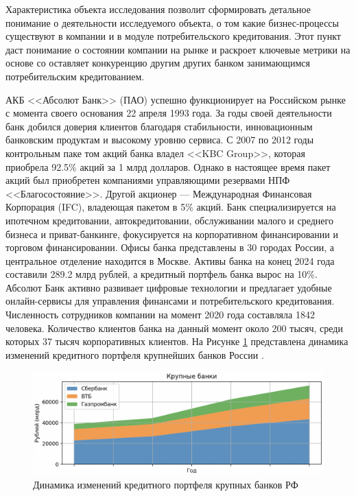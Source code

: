 \documentclass[14pt, a4paper]{extarticle}
\begin{document}
Характеристика объекта исследования позволит сформировать детальное понимание о
деятельности исследуемого объекта, о том какие бизнес-процессы существуют в
компании и в модуле потребительского кредитования. Этот пункт даст понимание о
состоянии компании на рынке и раскроет ключевые метрики на основе со
оставляет конкуренцию другим других банком занимающимся потребительским
кредитованием.

АКБ <<Абсолют Банк>> (ПАО) успешно функционирует на Российском рынке с момента
своего основания 22 апреля 1993 года. За годы своей деятельности банк добился
доверия клиентов благодаря стабильности, инновационным банковским продуктам и
высокому уровню сервиса. С 2007 по 2012 годы контрольным паке том акций банка
владел <<KBC Group>>, которая приобрела 92.5\% акций за 1 млрд долларов. Однако
в настоящее время пакет акций был приобретен компаниями управляющими резервами
НПФ <<Благосостояние>>. Другой акционер — Международная Финансовая Корпорация
(IFC), владеющая пакетом в 5\% акций. Банк специализируется на ипотечном
кредитовании, автокредитовании, обслуживании малого и среднего бизнеса и
приват-банкинге, фокусируется на корпоративном финансировании и торговом
финансировании. Офисы банка представлены в 30 городах России, а центральное
отделение находится в Москве. Активы банка на конец 2024 года составили 289.2
млрд рублей, а кредитный портфель банка вырос на 10\%. Абсолют Банк активно
развивает цифровые технологии и предлагает удобные онлайн-сервисы для
управления финансами и потребительского кредитования. Численность сотрудников
компании на момент 2020 года составляла 1842 человека. Количество клиентов
банка на данный момент около 200 тысяч, среди которых 37 тысяч корпоративных
клиентов. На Рисунке \ref{fig:кредитный_портфель_банков_крупные} представлена
динамика изменений кредитного портфеля крупнейших банков России
\cite{banks-rating}.

\begin{figure}[H]
	\centering
	\includegraphics[width=\textwidth]{кредитный_портфель_банков_крупные}
	\caption{Динамика изменений кредитного портфеля крупных банков РФ}
	\label{fig:кредитный_портфель_банков_крупные}
\end{figure}
\end{document}
